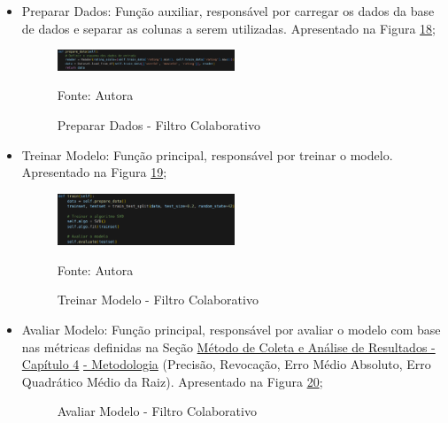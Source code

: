 \begin{itemize}
    \item Preparar Dados: Função auxiliar, responsável por carregar os dados da base de dados e separar as colunas a serem 
    utilizadas. Apresentado na Figura \hyperref[fig:prepdata-fc]{18};
    \begin{figure}[htbp]
        \centering
        \caption{Preparar Dados - Filtro Colaborativo}
        \label{fig:prepdata-fc}
        
        \vspace{2pt} %
        
        \includegraphics[width=0.5\textwidth]{figuras/prepdata-fc.eps}
        
        \vspace{2pt} %
        
        \small Fonte: Autora
    \end{figure}

    \item Treinar Modelo: Função principal, responsável por treinar o modelo. Apresentado na Figura \hyperref[fig:train-fc]{19};
    \begin{figure}[htbp]
        \centering
        \caption{Treinar Modelo - Filtro Colaborativo}
        \label{fig:train-fc}
        
        \vspace{2pt} %
        
        \includegraphics[width=0.5\textwidth]{figuras/train-fc.eps}
        
        \vspace{2pt} %
        
        \small Fonte: Autora
    \end{figure}

    \item Avaliar Modelo: Função principal, responsável por avaliar o modelo com base nas métricas definidas na Seção 
    \hyperref[sec:meteanresul]{Método de Coleta e Análise de Resultados - Capítulo 4}
    \hyperref[sec:meteanresul]{ - Metodologia} 
    (Precisão, Revocação, Erro Médio Absoluto, Erro Quadrático Médio da Raiz).
    Apresentado na Figura \hyperref[fig:evaluate-fc]{20};
    \begin{figure}[htbp]
        \centering
        \caption{Avaliar Modelo - Filtro Colaborativo}
        \label{fig:evaluate-fc}
        

\end{figure}
\end{itemize}
